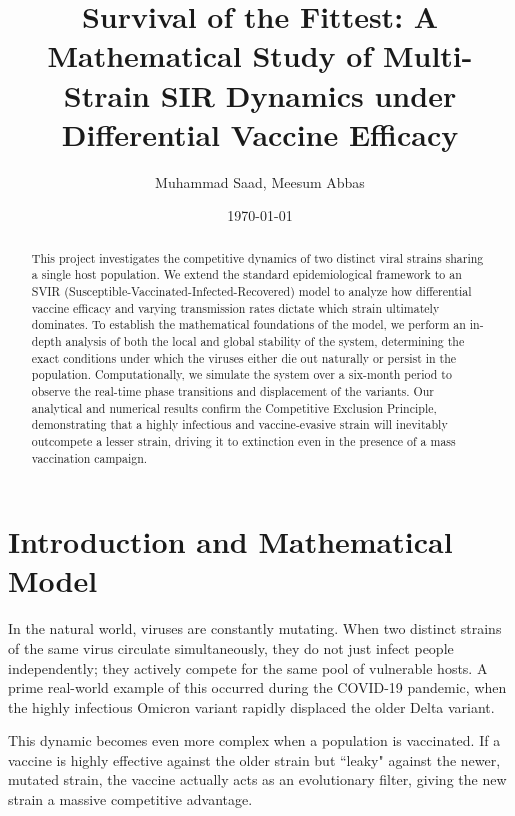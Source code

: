 \documentclass[12pt]{article}
\title{Survival of the Fittest: A Mathematical Study of Multi-Strain SIR Dynamics under Differential Vaccine Efficacy}
\author{Muhammad Saad, Meesum Abbas}
\date{\today}
\begin{document}
\maketitle

\begin{abstract}
This project investigates the competitive dynamics of two distinct viral strains sharing a single host population. We extend the standard epidemiological framework to an SVIR (Susceptible-Vaccinated-Infected-Recovered) model to analyze how differential vaccine efficacy and varying transmission rates dictate which strain ultimately dominates. To establish the mathematical foundations of the model, we perform an in-depth analysis of both the local and global stability of the system, determining the exact conditions under which the viruses either die out naturally or persist in the population. Computationally, we simulate the system over a six-month period to observe the real-time phase transitions and displacement of the variants. Our analytical and numerical results confirm the Competitive Exclusion Principle, demonstrating that a highly infectious and vaccine-evasive strain will inevitably outcompete a lesser strain, driving it to extinction even in the presence of a mass vaccination campaign.
\end{abstract}

\section{Introduction and Mathematical Model}

In the natural world, viruses are constantly mutating. When two distinct strains of the same virus circulate simultaneously, they do not just infect people independently; they actively compete for the same pool of vulnerable hosts. A prime real-world example of this occurred during the COVID-19 pandemic, when the highly infectious Omicron variant rapidly displaced the older Delta variant. 

This dynamic becomes even more complex when a population is vaccinated. If a vaccine is highly effective against the older strain but ``leaky" against the newer, mutated strain, the vaccine actually acts as an evolutionary filter, giving the new strain a massive competitive advantage. 
\end{document}
